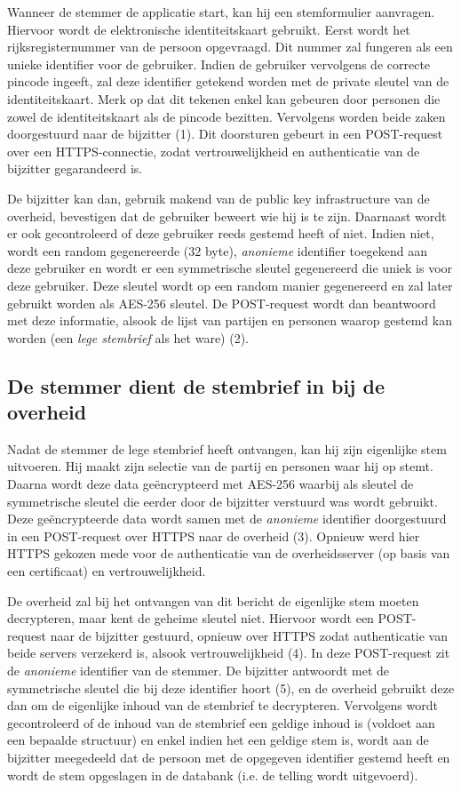 \documentclass[a4paper,12pt]{article}
\begin{document}
Wanneer de stemmer de applicatie start, kan hij een stemformulier aanvragen.
Hiervoor wordt de elektronische identiteitskaart gebruikt. Eerst wordt het
rijksregisternummer van de persoon opgevraagd.  Dit nummer zal fungeren als een
unieke identifier voor de gebruiker. Indien de gebruiker vervolgens de correcte
pincode ingeeft, zal deze identifier getekend worden met de private sleutel van
de identiteitskaart. Merk op dat dit tekenen enkel kan gebeuren door personen
die zowel de identiteitskaart als de pincode bezitten. Vervolgens worden beide
zaken doorgestuurd naar de bijzitter (1).  Dit doorsturen gebeurt in een
POST-request over een HTTPS-connectie, zodat vertrouwelijkheid en authenticatie
van de bijzitter gegarandeerd is.

De bijzitter kan dan, gebruik makend van de public key infrastructure van de
overheid, bevestigen dat de gebruiker beweert wie hij is te zijn. Daarnaast
wordt er ook gecontroleerd of deze gebruiker reeds gestemd heeft of niet. Indien
niet, wordt een random gegenereerde (32 byte), \emph{anonieme} identifier
toegekend aan deze gebruiker en wordt er een symmetrische sleutel gegenereerd
die uniek is voor deze gebruiker. Deze sleutel wordt op een random manier
gegenereerd en zal later gebruikt worden als AES-256 sleutel.  De POST-request
wordt dan beantwoord met deze informatie, alsook de lijst van partijen en
personen waarop gestemd kan worden (een \emph{lege stembrief} als het ware)
(2).

\subsection{De stemmer dient de stembrief in bij de overheid}

Nadat de stemmer de lege stembrief heeft ontvangen, kan hij zijn eigenlijke
stem uitvoeren. Hij maakt zijn selectie van de partij en personen waar hij op
stemt. Daarna wordt deze data ge\"encrypteerd met AES-256 waarbij als sleutel de
symmetrische sleutel die eerder door de bijzitter verstuurd was wordt gebruikt.
Deze ge\"encrypteerde data wordt samen met de \emph{anonieme} identifier
doorgestuurd in een POST-request over HTTPS naar de overheid (3). Opnieuw werd
hier HTTPS gekozen mede voor de authenticatie van de overheidsserver (op basis
van een certificaat) en vertrouwelijkheid.

De overheid zal bij het ontvangen van dit bericht de eigenlijke stem moeten
decrypteren, maar kent de geheime sleutel niet. Hiervoor wordt een POST-request
naar de bijzitter gestuurd, opnieuw over HTTPS zodat authenticatie van beide
servers verzekerd is, alsook vertrouwelijkheid (4). In deze POST-request zit
de \emph{anonieme} identifier van de stemmer. De bijzitter antwoordt met de
symmetrische sleutel die bij deze identifier hoort (5), en de overheid gebruikt
deze dan om de eigenlijke inhoud van de stembrief te decrypteren. Vervolgens
wordt gecontroleerd of de inhoud van de stembrief een geldige inhoud is (voldoet
aan een bepaalde structuur) en enkel indien het een geldige stem is, wordt aan
de bijzitter meegedeeld dat de persoon met de opgegeven identifier gestemd heeft
en wordt de stem opgeslagen in de databank (i.e. de telling wordt uitgevoerd).
\end{document}
